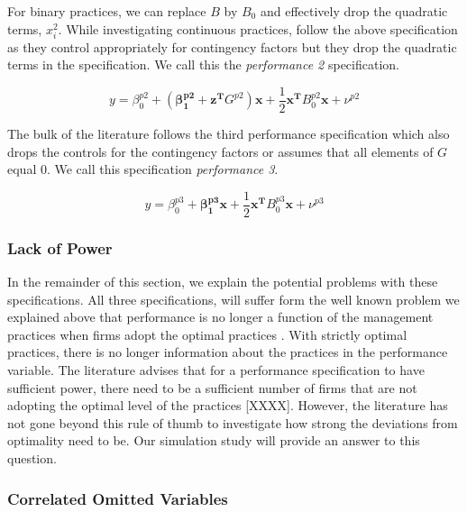\documentclass[12pt]{article}
\begin{document}
For binary practices, we can replace $B$ by $B_0$ and effectively drop the quadratic terms, $x_i^2$.  While investigating continuous practices, \citet{Bedford2016} follow the above specification as they control appropriately for contingency factors but they drop the quadratic terms in the specification. We call this the \emph{performance 2} specification.

\begin{equation*}
    y = \beta_0^{p2} + (\mathbf{\beta_1^{p2}} + \mathbf{z^T} G^{p2}) \mathbf{x} + 
    \frac{1}{2}\mathbf{x^T} B_0^{p2} \mathbf{x} + \nu^{p2}
\end{equation*}

The bulk of the literature follows the third performance specification
which also drops the controls for the contingency factors or assumes
that all elements of $G$ equal $0$. We call this specification \emph{performance 3}.

\begin{equation*}
    y = \beta_0^{p3} + \mathbf{\beta_1^{p3}} \mathbf{x} + 
    \frac{1}{2}\mathbf{x^T} B_0^{p3} \mathbf{x} + \nu^{p3}
\end{equation*}

\subsubsection{Lack of Power}

In the remainder of this section, we explain the potential problems with these specifications. All three specifications, will suffer form the well known problem we explained above that performance is no longer a function of the management practices when firms adopt the optimal practices \citep{Grabner2013}. With strictly optimal practices, there is no longer information about the practices in the performance variable. The literature advises that for a performance specification to have sufficient power, there need to be a sufficient number of firms that are not adopting the optimal level of the practices [XXXX]. However, the literature has not gone beyond this rule of thumb to investigate how strong the deviations from optimality need to be. Our simulation study will provide an answer to this question.

\subsubsection{Correlated Omitted Variables}
\end{document}
